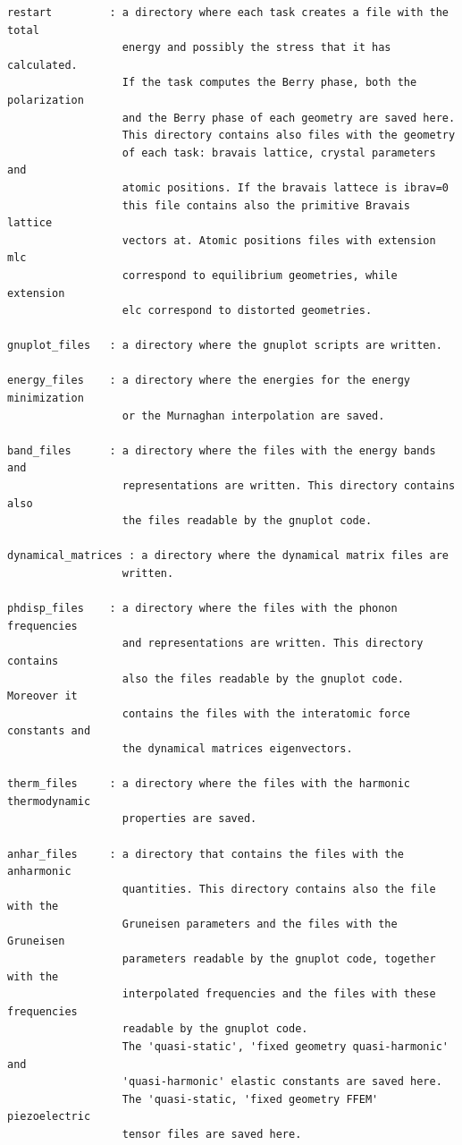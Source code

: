\documentclass[12pt,a4paper,twoside]{report}
\begin{document}
\begin{footnotesize}
\begin{verbatim}
restart         : a directory where each task creates a file with the total
                  energy and possibly the stress that it has calculated.
                  If the task computes the Berry phase, both the polarization
                  and the Berry phase of each geometry are saved here.
                  This directory contains also files with the geometry
                  of each task: bravais lattice, crystal parameters and
                  atomic positions. If the bravais lattece is ibrav=0 
                  this file contains also the primitive Bravais lattice 
                  vectors at. Atomic positions files with extension mlc 
                  correspond to equilibrium geometries, while extension 
                  elc correspond to distorted geometries.

gnuplot_files   : a directory where the gnuplot scripts are written.

energy_files    : a directory where the energies for the energy minimization
                  or the Murnaghan interpolation are saved.

band_files      : a directory where the files with the energy bands and 
                  representations are written. This directory contains also
                  the files readable by the gnuplot code.

dynamical_matrices : a directory where the dynamical matrix files are
                  written.

phdisp_files    : a directory where the files with the phonon frequencies
                  and representations are written. This directory contains
                  also the files readable by the gnuplot code. Moreover it
                  contains the files with the interatomic force constants and
                  the dynamical matrices eigenvectors.

therm_files     : a directory where the files with the harmonic thermodynamic
                  properties are saved.

anhar_files     : a directory that contains the files with the anharmonic
                  quantities. This directory contains also the file with the
                  Gruneisen parameters and the files with the Gruneisen
                  parameters readable by the gnuplot code, together with the 
                  interpolated frequencies and the files with these frequencies
                  readable by the gnuplot code.
                  The 'quasi-static', 'fixed geometry quasi-harmonic' and
                  'quasi-harmonic' elastic constants are saved here.
                  The 'quasi-static, 'fixed geometry FFEM' piezoelectric
                  tensor files are saved here.


\end{verbatim}
\end{footnotesize}
\end{document}
